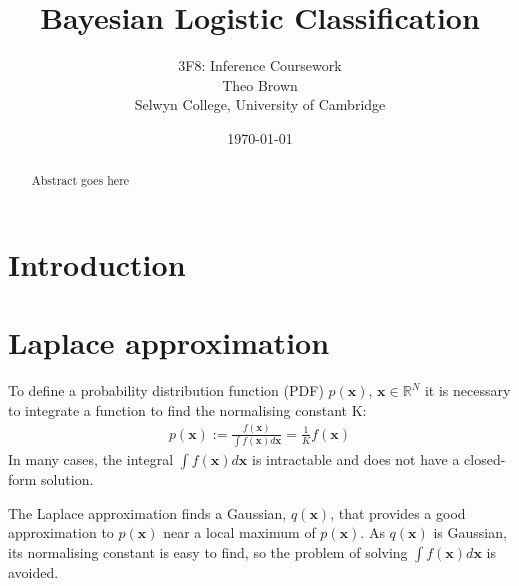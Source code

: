 \documentclass[a4paper]{article}
\begin{document}
    \title{Bayesian Logistic Classification}
    \author{3F8: Inference Coursework \\ Theo Brown \\ Selwyn College, University of Cambridge}
    \date{\today}
    \maketitle

    \begin{abstract}
        Abstract goes here
    \end{abstract}
    
    \section{Introduction}\label{sec:introduction}

    \section{Laplace approximation}\label{sec:laplace-approximation}
    To define a probability distribution function (PDF) $p(\bm{x})$, $\bm{x} \in \mathbb{R}^N$ it is necessary to integrate a function to find the
    normalising constant K:
    \begin{align}
        p(\bm{x}) := \frac{f(\bm{x})}{\int f(\bm{x}) d\bm{x}} = \frac{1}{K} f(\bm{x})
    \end{align}
    In many cases, the integral $\int f(\bm{x}) d\bm{x}$ is intractable and does not have a closed-form solution.

    The Laplace approximation finds a Gaussian, $q(\bm{x})$, that provides a good approximation to $p(\bm{x})$ near a
    local maximum of $p(\bm{x})$. As $q(\bm{x})$ is Gaussian, its normalising constant is easy to find, so the
    problem of solving $\int f(\bm{x}) d\bm{x}$ is avoided.
\end{document}

